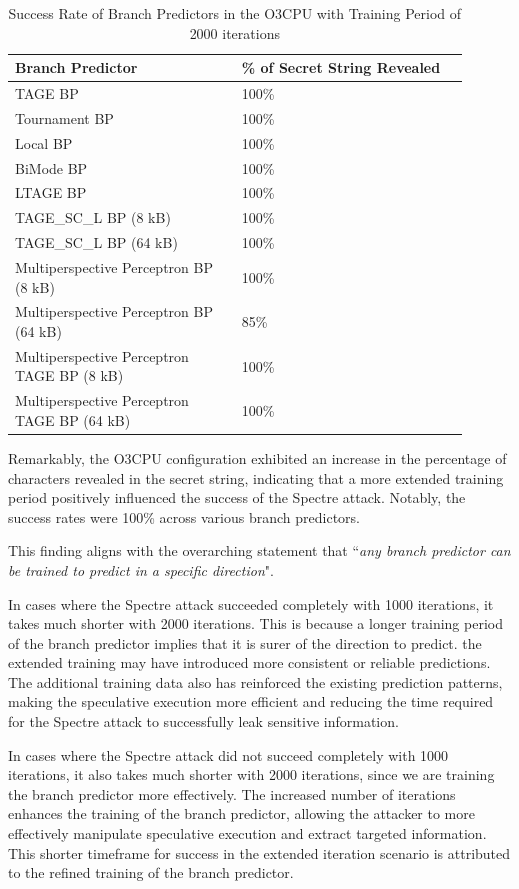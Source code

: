 \documentclass[twocolumn,showpacs,%
  nofootinbib,aps,superscriptaddress,%
  eqsecnum,prd,notitlepage,showkeys,10pt]{revtex4-1}
\begin{document}
\begin{table}
\centering
\caption{Success Rate of Branch Predictors in the O3CPU with Training Period of 2000 iterations}
\small
\begin{tabular}{p{0.45\linewidth}p{0.45\linewidth}}
\hline
Branch Predictor & \% of Secret String Revealed \\
\hline
TAGE BP & 100\% \\
Tournament BP & 100\% \\
Local BP & 100\% \\
BiMode BP & 100\% \\
LTAGE BP & 100\% \\
TAGE\_SC\_L BP (8 kB) & 100\% \\
TAGE\_SC\_L BP (64 kB) & 100\% \\
Multiperspective Perceptron BP (8 kB) & 100\% \\
Multiperspective Perceptron BP (64 kB) & 85\% \\
Multiperspective Perceptron TAGE BP (8 kB) & 100\% \\
Multiperspective Perceptron TAGE BP (64 kB) & 100\% \\
\hline
\end{tabular}
\end{table}

Remarkably, the O3CPU configuration exhibited an increase in the percentage of characters revealed in the secret string, indicating that a more extended training period positively influenced the success of the Spectre attack. Notably, the success rates were 100\% across various branch predictors.

This finding aligns with the overarching statement that ``\textit{any branch predictor can be trained to predict in a specific direction}".

In cases where the Spectre attack succeeded completely with 1000 iterations, it takes much shorter with 2000 iterations. This is because a longer training period of the branch predictor implies that it is surer of the direction to predict. the extended training may have introduced more consistent or reliable predictions. The additional training data also has reinforced the existing prediction patterns, making the speculative execution more efficient and reducing the time required for the Spectre attack to successfully leak sensitive information.

In cases where the Spectre attack did not succeed completely with 1000 iterations, it also takes much shorter with 2000 iterations, since we are training the branch predictor more effectively. The increased number of iterations enhances the training of the branch predictor, allowing the attacker to more effectively manipulate speculative execution and extract targeted information. This shorter timeframe for success in the extended iteration scenario is attributed to the refined training of the branch predictor.
\end{document}
